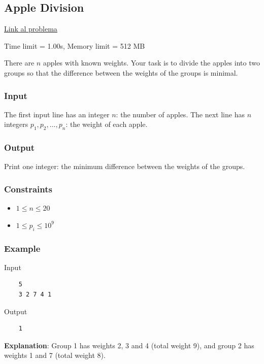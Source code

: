\subsection{Apple Division}
\label{problema:bitmask:Apple-division}

\href{https://cses.fi/problemset/task/1623/}{Link al problema}

\noindent Time limit = 1.00s, Memory limit = 512 MB
\bigskip

There are $n$ apples with known weights. Your task is to divide the apples into two groups so that the difference between the weights of the groups is minimal.

\subsubsection*{Input}
The first input line has an integer $n$: the number of apples.
\medskip
The next line has $n$ integers $p_1,p_2,\dots,p_n$: the weight of each apple.


\subsubsection*{Output}
Print one integer: the minimum difference between the weights of the groups.

\subsubsection*{Constraints}
\begin{itemize}
	\item $1 \le n \le 20$
	\item $1 \le p_i \le 10^9$
\end{itemize}

\subsubsection*{Example}

Input

\begin{verbatim}
	5
	3 2 7 4 1
\end{verbatim}

\noindent Output

\begin{verbatim}
	1
\end{verbatim}

\textbf{Explanation}: Group 1 has weights 2, 3 and 4 (total weight 9), and group 2 has weights 1 and 7 (total weight 8).


